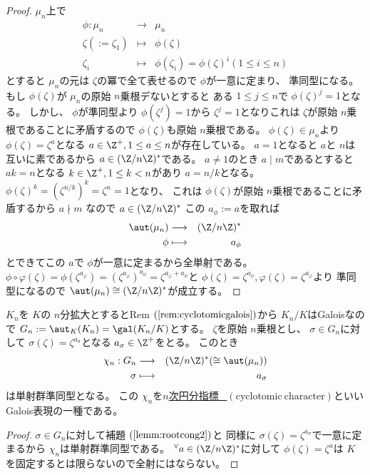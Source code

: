 \documentclass[../master_galois_theory]{subfiles}
\begin{document}
\begin{proof}
  $\mu_n$上で
  \begin{eqnarray*}
    \phi : \mu_n & \longrightarrow & \mu_n \\
    \zeta ( := \zeta_1) & \longmapsto & \phi(\zeta) \\
    \zeta_i & \longmapsto & \phi(\zeta_i) = \phi(\zeta)^i (1 \leq i \leq n)
  \end{eqnarray*}
  とすると $\mu_n$の元は $\zeta$の冪で全て表せるので $\phi$が一意に定まり、
  準同型になる。
  もし $\phi(\zeta)$が $\mu_n$の原始 $n$乗根デないとすると
  ある $ 1 \leq j \leq n$で $\phi(\zeta)^j = 1$となる。
  しかし、 $\phi$が準同型より $\phi(\zeta^j) = 1$から $\zeta^j = 1$となりこれは
  $\zeta$が原始 $n$乗根であることに矛盾するので $\phi(\zeta)$も原始 $n$乗根である。
  $\phi(\zeta) \in \mu_n$より $\phi(\zeta) = \zeta^a$となる $a \in \Z^+ , 1 \leq a \leq n$が存在している。
  $a = 1$となると $a$と $n$は互いに素であるから $a \in (\Z/n\Z)^*$である。
  $a \neq 1$のとき $a \mid m$であるとすると $ak = n$となる $k \in \Z^+ , 1 \leq k < n$があり $a = n/k$となる。
  $\phi(\zeta)^k = (\zeta^{n/k})^k = \zeta^n = 1$となり、
  これは $\phi(\zeta)$が原始 $n$乗根であることに矛盾するから $a \nmid m$
  なので $a \in (\Z/n\Z)^*$
  この $a_\phi := a$を取れば
  \begin{eqnarray*}
    \aut(\mu_n) & \longrightarrow & (\Z/n\Z)^* \\
    \phi & \longmapsto & a_\phi
  \end{eqnarray*}
  とできてこの $a$で $\phi$が一意に定まるから全単射である。
  $\phi \circ \varphi (\zeta) = \phi(\zeta^{a_\varphi}) = (\zeta^{a_\varphi})^{a_\phi} = \zeta^{a_\varphi + a_\phi}$と
  $\phi(\zeta) = \zeta^{a_\phi} , \varphi(\zeta) = \zeta^{a_\varphi}$より
  準同型になるので
  $\aut(\mu_n) \cong (\Z/n\Z)^*$が成立する。
\end{proof}

\begin{prop}
  $K_n$を $K$の $n$分拡大とすると\rm{Rem} $(\mathrm{\ref{rem:cyclotomicgalois}})$から $K_n/K$は\rm{Galois}なので
  $G_n := \aut_K(K_n) = \gal(K_n/K)$とする。
  $\zeta$を原始 $n$乗根とし、 $\sigma \in G_n$に対して
  $\sigma(\zeta) = \zeta^{a_\sigma}$となる $a_\sigma \in \Z^+$をとる。
  このとき
  \begin{eqnarray*}
    \chi_n : G_n & \longrightarrow & (\Z/n\Z)^* (\cong \aut(\mu_n)) \\
    \sigma & \longmapsto & a_\sigma
  \end{eqnarray*}
  は単射群準同型となる。
  この $\chi_n$を\underline{$n$次円分指標 \  $(\mathrm{cyclotomic \  character})$}といい\rm{Galois}表現の一種である。
\end{prop}

\begin{proof}
  $\sigma \in G_n$に対して補題 $(\mathrm{\ref{lemm:rootcong2}})$と
  同様に $\sigma(\zeta) = \zeta^{a_\sigma}$で一意に定まるから
  $\chi_n$は単射群準同型である。
  ${}^\forall a \in (\Z/n\Z)^*$に対して $\phi(\zeta) = \zeta^a$は
  $K$を固定するとは限らないので全射にはならない。
\end{proof}
\end{document}
